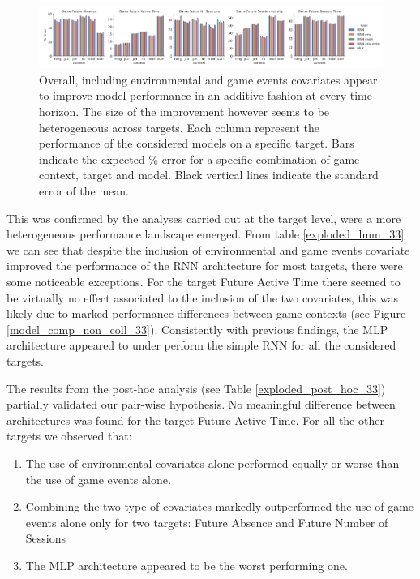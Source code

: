 \begin{figure}[h]
\centering
\includegraphics[width=\textwidth]{images/chapter_3/models_comparison_collapsed_time_33.png}
\caption[\textbf{Model comparison collapsing over time}]{Overall, including environmental and game events covariates appear to improve model performance in an additive fashion at every time horizon. The size of the improvement however seems to be heterogeneous across targets. Each column represent the performance of the considered models on a specific target. Bars indicate the expected \% error for a specific combination of game context, target and model. Black vertical lines indicate the standard error of the mean.}
\label{model_comp_coll_time_33} 
\end{figure}
This was confirmed by the analyses carried out at the target level, were a more heterogeneous performance landscape emerged. From table \ref{exploded_lmm_33} we can see that despite the inclusion of environmental and game events covariate improved the performance of the RNN architecture for most targets, there were some noticeable exceptions. For the target Future Active Time there seemed to be virtually no effect associated to the inclusion of the two covariates, this was likely due to marked performance differences between game contexts (see Figure \ref{model_comp_non_coll_33}). Consistently with previous findings, the MLP architecture appeared to under perform the simple RNN for all the considered targets.   


The results from the post-hoc analysis (see Table \ref{exploded_post_hoc_33}) partially validated our pair-wise hypothesis. No meaningful difference between architectures was found for the target Future Active Time. For all the other targets we observed that:
\begin{enumerate}
    \item The use of environmental covariates alone performed equally or worse than the use of game events alone.
    \item Combining the two type of covariates markedly outperformed the use of game events alone only for two targets: Future Absence and Future Number of Sessions
    \item The MLP architecture appeared to be the worst performing one.
\end{enumerate}
